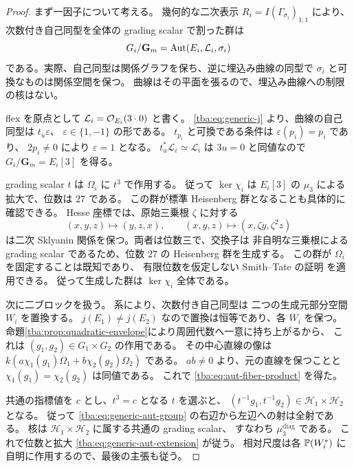 \begin{proof}
まず一因子について考える。
幾何的な二次表示 $R_i=I(\Gamma_{\sigma_i})_{1,1}$ により、
次数付き自己同型を全体の grading scalar で割った群は
\[
 G_i/\mathbf G_m
   =\operatorname{Aut}(E_i,\mathcal L_i,\sigma_i)
\]
である。実際、自己同型は関係グラフを保ち、逆に埋込み曲線の同型で
$\sigma_i$ と可換なものは関係空間を保つ。
曲線はその平面を張るので、埋込み曲線への制限の核はない。

flex を原点として $\mathcal L_i=\mathcal O_{E_i}(3\cdot0)$ と書く。
\eqref{tba:eq:generic-j} より、曲線の自己同型は $t_u\varepsilon$、
$\varepsilon\in\{1,-1\}$ の形である。
$t_{p_i}$ と可換である条件は $\varepsilon(p_i)=p_i$ であり、
$2p_i\ne0$ により $\varepsilon=1$ となる。
$t_u^*\mathcal L_i\simeq\mathcal L_i$ は $3u=0$ と同値なので
$G_i/\mathbf G_m=E_i[3]$ を得る。

grading scalar $t$ は $\Omega_i$ に $t^3$ で作用する。
従って $\ker\chi_i$ は $E_i[3]$ の $\mu_3$ による拡大で、位数は $27$ である。
この群が標準 Heisenberg 群となることも具体的に確認できる。
Hesse 座標では、原始三乗根 $\zeta$ に対する
\[
 (x,y,z)\longmapsto(y,z,x),\qquad
 (x,y,z)\longmapsto(x,\zeta y,\zeta^2z)
\]
は二次 Sklyanin 関係を保つ。両者は位数三で、交換子は
非自明な三乗根による grading scalar であるため、位数 $27$ の Heisenberg 群を生成する。
この群が $\Omega_i$ を固定することは既知であり、
有限位数を仮定しない Smith--Tate の証明
\cite[p.~36, Remark~(2) after Lemma~3.4]{GRSklyaninST}
を適用できる。
従って生成した群は $\ker\chi_i$ 全体である。

次に二ブロックを扱う。
系により、次数付き自己同型は
二つの生成元部分空間 $W_i$ を置換する。
$j(E_1)\ne j(E_2)$ なので置換は恒等であり、各 $W_i$ を保つ。
命題\ref{tba:prop:quadratic-envelope}により周囲代数へ一意に持ち上がるから、
これは $(g_1,g_2)\in G_1\times G_2$ の作用である。
その中心直線の像は
$k(a\chi_1(g_1)\Omega_1+b\chi_2(g_2)\Omega_2)$ である。
$ab\ne0$ より、元の直線を保つことと
$\chi_1(g_1)=\chi_2(g_2)$ は同値である。
これで \eqref{tba:eq:aut-fiber-product} を得た。

共通の指標値を $c$ とし、$t^3=c$ となる $t$ を選ぶと、
$(t^{-1}g_1,t^{-1}g_2)\in\mathcal H_1\times\mathcal H_2$ となる。
従って \eqref{tba:eq:generic-aut-group} の右辺から左辺への射は全射である。
核は $\mathcal H_1\times\mathcal H_2$ に属する共通の grading scalar、
すなわち $\mu_3^{\mathrm{diag}}$ である。
これで位数と拡大 \eqref{tba:eq:generic-aut-extension} が従う。
相対尺度は各 $\mathbb P(W_i^*)$ に自明に作用するので、最後の主張も従う。
\end{proof}

